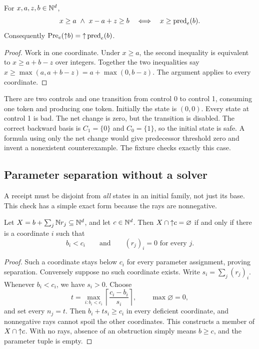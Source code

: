 \begin{lemma}
\label{lem:pred}
For $x,a,z,b\in\mathbb N^d$,
\[
 x\ge a\ \land\ x-a+z\ge b
 \quad\Longleftrightarrow\quad x\ge\operatorname{pred}_e(b).
\]
Consequently $\operatorname{Pre}_e(\mathord{\uparrow}b)=\mathord{\uparrow}\operatorname{pred}_e(b)$.
\end{lemma}
\begin{proof}
Work in one coordinate. Under $x\ge a$, the second inequality is equivalent to
$x\ge a+b-z$ over integers. Together the two inequalities say
$x\ge\max(a,a+b-z)=a+\max(0,b-z)$. The argument applies to every coordinate.
\end{proof}

\begin{example}
There are two controls and one transition from control 0 to control 1, consuming
one token and producing one token. Initially the state is $(0,0)$. Every state
at control 1 is bad. The net change is zero, but the transition is disabled.
The correct backward basis is $C_1=\{0\}$ and $C_0=\{1\}$, so the initial
state is safe. A formula using only the net change would give predecessor
threshold zero and invent a nonexistent counterexample. The fixture
 checks exactly this case.
\end{example}

\subsection{Parameter separation without a solver}
A receipt must be disjoint from \emph{all} states in an initial family, not just
its base. This check has a simple exact form because the rays are nonnegative.

\begin{lemma}
\label{lem:separation}
Let $X=b+\sum_j\mathbb N r_j\subseteq\mathbb N^d$, and let $c\in\mathbb N^d$.
Then $X\cap\mathord{\uparrow}c=\varnothing$ if and only if there is a coordinate $i$ such that
\[
 b_i<c_i\qquad\text{and}\qquad (r_j)_i=0\text{ for every }j.
\]
\end{lemma}
\begin{proof}
Such a coordinate stays below $c_i$ for every parameter assignment, proving
separation. Conversely suppose no such coordinate exists. Write
$s_i=\sum_j(r_j)_i$. Whenever $b_i<c_i$, we have $s_i>0$. Choose
\begin{equation}
 t=\max_{i:b_i<c_i}\left\lceil\frac{c_i-b_i}{s_i}\right\rceil,
 \qquad\max\varnothing=0,
 \label{eq:commonparameter}
\end{equation}
and set every $n_j=t$. Then $b_i+t s_i\ge c_i$ in every deficient coordinate,
and nonnegative rays cannot spoil the other coordinates. This constructs a
member of $X\cap\mathord{\uparrow}c$. With no rays, absence of an obstruction simply means
$b\ge c$, and the parameter tuple is empty.
\end{proof}

